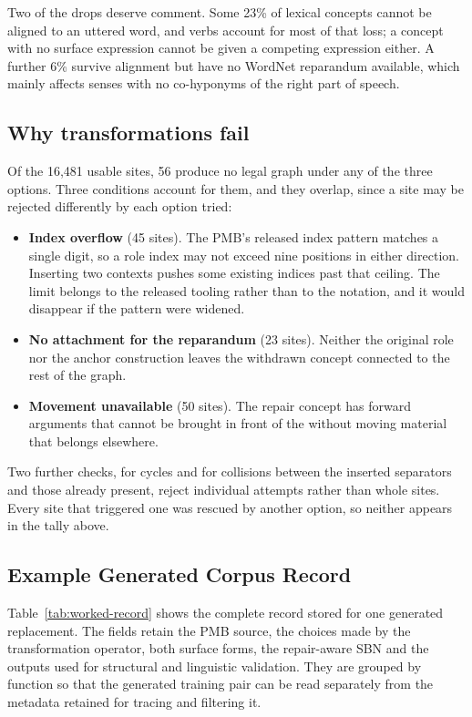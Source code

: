 \documentclass{article}
\begin{document}
Two of the drops deserve comment. Some 23\% of lexical concepts cannot be
aligned to an uttered word, and verbs account for most of that loss; a concept
with no surface expression cannot be given a competing expression either. A
further 6\% survive alignment but have no WordNet reparandum available, which
mainly affects senses with no co-hyponyms of the right part of speech.

\subsection{Why transformations fail}
\label{app:devices-blockers}

Of the 16,481 usable sites, 56 produce no legal graph under any of the three
options. Three conditions account for them, and they overlap, since a site may
be rejected differently by each option tried:

\begin{itemize}[nosep]
  \item \textbf{Index overflow} (45 sites). The PMB's released index pattern
    matches a single digit, so a role index may not exceed nine positions in
    either direction. Inserting two contexts pushes some existing indices past
    that ceiling. The limit belongs to the released tooling rather than to the
    notation, and it would disappear if the pattern were widened.
  \item \textbf{No attachment for the reparandum} (23 sites). Neither the
    original role nor the anchor construction leaves the withdrawn concept
    connected to the rest of the graph.
  \item \textbf{Movement unavailable} (50 sites). The repair concept has
    forward arguments that cannot be brought in front of the
     without moving material that belongs elsewhere.
\end{itemize}

Two further checks, for cycles and for collisions between the inserted
separators and those already present, reject individual attempts rather than
whole sites. Every site that triggered one was rescued by another option, so
neither appears in the tally above.

\subsection{Example Generated Corpus Record}
\label{app:generated-record}

Table~\ref{tab:worked-record} shows the complete record stored for one
generated replacement. The fields retain the PMB source, the choices made by
the transformation operator, both surface forms, the repair-aware SBN and the
outputs used for structural and linguistic validation. They are grouped by
function so that the generated training pair can be read separately from the
metadata retained for tracing and filtering it.
\end{document}
